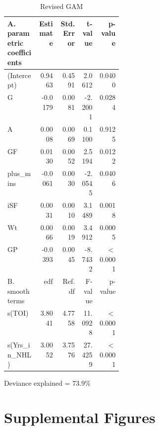 \documentclass[10pt]{article}
\begin{document}
{{{{\begin{table}[tph]
\centering
\caption{Revised GAM} 
\label{tab.gam.revised}
\begin{threeparttable}
\begin{tabular}[t]{L{0.27\linewidth}rrrr} 
   \toprule
A. parametric coefficients & Estimate & Std. Error & t-value & p-value \\  
  \midrule
  (Intercept) & 0.9463 & 0.4591 & 2.0612 & 0.0400 \\ 
  G & -0.0179 & 0.0081 & -2.2001 & 0.0284 \\ 
  A & 0.0008 & 0.0069 & 0.1100 & 0.9125 \\ 
  GF & 0.0130 & 0.0052 & 2.5194 & 0.0122 \\ 
  plus\_mins & -0.0061 & 0.0030 & -2.0545 & 0.0406 \\ 
  iSF & 0.0031 & 0.0010 & 3.1489 & 0.0018 \\ 
  Wt & 0.0066 & 0.0019 & 3.4912 & 0.0005 \\ 
  GP & -0.0393 & 0.0045 & -8.7432 & $<$ 0.0001 \\ 
   \midrule
B. smooth terms & edf & Ref.df & F-value & p-value \\ 
  \midrule
  s(TOI) & 3.8041 & 4.7758 & 11.0928 & $<$ 0.0001 \\ 
  s(Yrs\_in\_NHL) & 3.0052 & 3.7576 & 27.4259 & $<$ 0.0001 \\ 
   \bottomrule
\end{tabular}
    \begin{tablenotes}
      \item Deviance explained = 73.9\%
    \end{tablenotes}
  \end{threeparttable}    
\end{table}

\vfill\break
\section{Supplemental Figures}
\label{a:supplemental-fig}

}}}}
\end{document}

